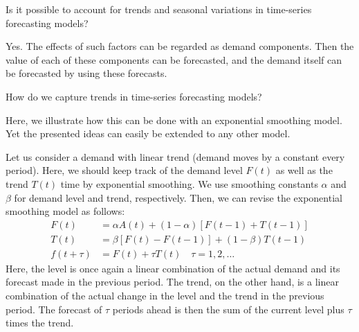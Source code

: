 \begin{question}
Is it possible to account for trends and seasonal variations in time-series forecasting models?

  \begin{solution}
   Yes. The effects of such factors can be regarded as demand components. Then the value of each of these components can be forecasted, and the demand itself can be forecasted by using these forecasts. 
     \end{solution}
\end{question}
   

\begin{question}
How do we capture trends in time-series forecasting models?

  \begin{solution}   
   Here, we illustrate how this can be done with an exponential smoothing model. Yet the presented ideas can easily be extended to any other model. 
 
   Let us consider a demand with linear trend (demand moves by a constant every period). Here, we should keep track of the demand level $F(t)$ as well as the trend $T(t)$ time by exponential smoothing. We use smoothing constants $\alpha$ and $\beta$ for demand level and trend, respectively. Then, we can revise the exponential smoothing model as follows:
\begin{align*}
F(t) & = \alpha A(t) + (1-\alpha) [F(t-1)+T(t-1)] \\
T(t) & = \beta [F(t)-F(t-1)] + (1-\beta) T(t-1) \\
f(t+\tau) & = F(t) + \tau T(t) \quad \tau = 1,2,\ldots
\end{align*}
Here, the level is once again a linear combination of the actual demand and its forecast made in the previous period. The trend, on the other hand, is a linear combination of the actual change in the level and the trend in the previous period. The forecast of $\tau$ periods ahead is then the sum of the current level plus $\tau$ times the trend. 
  \end{solution}
\end{question}

